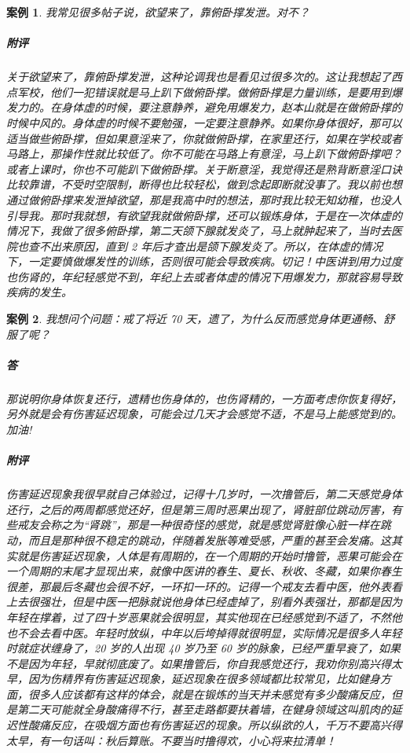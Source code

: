 \documentclass[fontset=founder]{ctexart}
\newtheorem{case}{案例}
\begin{document}
\begin{case}
    我常见很多帖子说，欲望来了，靠俯卧撑发泄。对不？
    \subparagraph{附评} 关于欲望来了，靠俯卧撑发泄，这种论调我也是看见过很多次的。这让我想起了西点军校，他们一犯错误就是马上趴下做俯卧撑。做俯卧撑是力量训练，是要用到爆发力的。在身体虚的时候，要注意静养，避免用爆发力，赵本山就是在做俯卧撑的时候中风的。身体虚的时候不要勉强，一定要注意静养。如果你身体很好，那可以适当做些俯卧撑，但如果意淫来了，你就做俯卧撑，在家里还行，如果在学校或者马路上，那操作性就比较低了。你不可能在马路上有意淫，马上趴下做俯卧撑吧？或者上课时，你也不可能趴下做俯卧撑。关于断意淫，我觉得还是熟背断意淫口诀比较靠谱，不受时空限制，断得也比较轻松，做到念起即断就没事了。我以前也想通过做俯卧撑来发泄掉欲望，那是我高中时的想法，那时我比较无知幼稚，也没人引导我。那时我就想，有欲望我就做俯卧撑，还可以锻炼身体，于是在一次体虚的情况下，我做了很多俯卧撑，第二天颌下腺就发炎了，马上就肿起来了，当时去医院也查不出来原因，直到 2 年后才查出是颌下腺发炎了。所以，在体虚的情况下，一定要慎做爆发性的训练，否则很可能会导致疾病。切记！中医讲到用力过度也伤肾的，年纪轻感觉不到，年纪上去或者体虚的情况下用爆发力，那就容易导致疾病的发生。
\end{case}

\begin{case}
    我想问个问题：戒了将近 70 天，遗了，为什么反而感觉身体更通畅、舒服了呢？
    \subparagraph{答} 那说明你身体恢复还行，遗精也伤身体的，也伤肾精的，一方面考虑你恢复得好，另外就是会有伤害延迟现象，可能会过几天才会感觉不适，不是马上能感觉到的。加油!
    \subparagraph{附评} 伤害延迟现象我很早就自己体验过，记得十几岁时，一次撸管后，第二天感觉身体还行，之后的两周都感觉还好，但是第三周时恶果出现了，肾脏部位跳动厉害，有些戒友会称之为“肾跳”，那是一种很奇怪的感觉，就是感觉肾脏像心脏一样在跳动，而且是那种很不稳定的跳动，伴随着发胀等难受感，严重的甚至会发痛。这其实就是伤害延迟现象，人体是有周期的，在一个周期的开始时撸管，恶果可能会在一个周期的末尾才显现出来，就像中医讲的春生、夏长、秋收、冬藏，如果你春生很差，那最后冬藏也会很不好，一环扣一环的。记得一个戒友去看中医，他外表看上去很强壮，但是中医一把脉就说他身体已经虚掉了，别看外表强壮，那都是因为年轻在撑着，过了四十岁恶果就会很明显，其实他现在已经感觉到不适了，不然他也不会去看中医。年轻时放纵，中年以后垮掉得就很明显，实际情况是很多人年轻时就症状缠身了，20 岁的人出现 40 岁乃至 60 岁的脉象，已经严重早衰了，如果不是因为年轻，早就彻底废了。如果撸管后，你自我感觉还行，我劝你别高兴得太早，因为伤精界有伤害延迟现象，延迟现象在很多领域都比较常见，比如健身方面，很多人应该都有这样的体会，就是在锻炼的当天并未感觉有多少酸痛反应，但是第二天可能就全身酸痛得不行，甚至走路都要扶着墙，在健身领域这叫肌肉的延迟性酸痛反应，在吸烟方面也有伤害延迟的现象。所以纵欲的人，千万不要高兴得太早，有一句话叫：秋后算账。不要当时撸得欢，小心将来拉清单！
\end{case}
\end{document}
